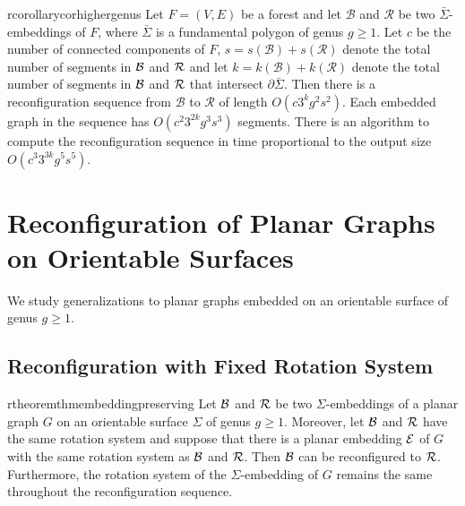 \documentclass[a4paper,USenglish,cleveref,colorlinks=true,urlcolor=black,linkcolor=black,citecolor=black,thm-restate,authorcolumns]{lipics-v2021}
\newcommand{\prooflink}[1]{\hypersetup{linkcolor=lipicsBulletGray}\hyperref[#1]{$\blacktriangledown$}}
\newcommand{\statlink}[1]{\hypersetup{linkcolor=lipicsYellow}\hyperref[#1]{$\blacktriangle$}}
\newcommand{\mylink}{}
\newcommand{\cprooflink}[1]{\hypersetup{linkcolor=lipicsBulletGray}\hyperref[#1]{$\triangledown$}}
\newcommand{\cstatlink}[1]{\hypersetup{linkcolor=lipicsYellow}\hyperref[#1]{$\vartriangle$}}
\newcommand{\cmylink}{}
\theoremstyle{claimstyle}
\begin{document}
\begin{restatable}{rcorollary}{corhighergenus}
    \label{cor:highergenus}
    \renewcommand{\cmylink}{\cstatlink{cor:highergenus}\cprooflink{Pcorhighergenus}}
    Let $F = (V,E)$ be a forest and let $\mathcal{B}$ and $\mathcal{R}$ be two $\bar{\Sigma}$-embeddings of $F$,
    where $\bar{\Sigma}$ is a fundamental polygon of genus $g\geq 1$.
    Let $c$ be the number of connected components of $F$,
    $s = s(\mathcal{B}) + s(\mathcal{R}) $ denote the total number of segments in  $\cal B$ and $\cal R$ and let $k = k(\mathcal{B}) + k(\mathcal{R})$ denote the total number of segments in $\cal B$ and $\cal R$  that intersect $\partial\bar\Sigma$.
    Then there is a reconfiguration sequence from $\mathcal{B}$ to $\mathcal{R}$ of length $O(c 3^k g^2s^2)$.
    Each embedded graph in the sequence has $O(c^2 3^{2k} g^3s^3)$ segments.
    There is an algorithm to compute the reconfiguration sequence in time proportional to the output size $O(c^3 3^{3k} g^5s^5)$.
\end{restatable}



\section{Reconfiguration of Planar Graphs on Orientable Surfaces}
\label{sec:restrictedSettings}

We study generalizations to planar graphs embedded on an orientable surface of genus $g\geq1$.

\subsection{Reconfiguration with Fixed Rotation System}
\label{ssec:embedding-preserving}



\begin{restatable}{rtheorem}{thmembeddingpreserving}
    \label{thm:embedding-preserving}
    \renewcommand{\mylink}{\statlink{thm:embedding-preserving}\prooflink{Pthmembeddingpreserving}}
    Let $\cal B$ and $\cal R$  be two $\Sigma$-embeddings of a planar graph $G$ on an orientable surface $\Sigma$ of genus $g\geq 1$. Moreover, let $\cal B$ and $\cal R$ have the same rotation system and suppose that there is a planar embedding $\cal E$ of $G$ with the same rotation system as $\cal B$ and $\cal R$. Then $\cal B$ can be reconfigured to $\cal R$. Furthermore, the rotation system of the $\Sigma$-embedding of $G$ remains the same throughout the reconfiguration sequence.
\end{restatable}
\end{document}
